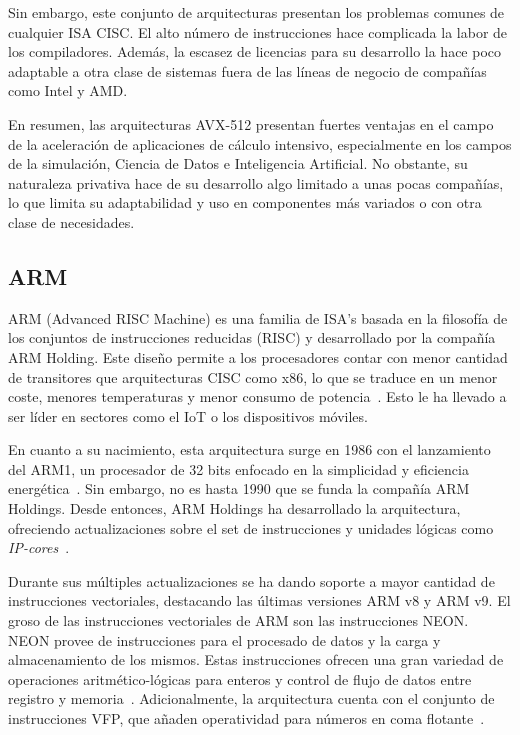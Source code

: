 Sin embargo, este conjunto de arquitecturas presentan los problemas comunes de
cualquier ISA CISC\@. El alto número de instrucciones hace complicada la
labor de los compiladores. Además, la escasez de licencias para su desarrollo
la hace poco adaptable a otra clase de sistemas fuera de las líneas de negocio
de compañías como Intel y AMD\@.

En resumen, las arquitecturas AVX-512 presentan fuertes ventajas en el campo de
la aceleración de aplicaciones de cálculo intensivo, especialmente en los
campos de la simulación, Ciencia de Datos e Inteligencia Artificial. No
obstante, su naturaleza privativa hace de su desarrollo algo limitado a unas
pocas compañías, lo que limita su adaptabilidad y uso en componentes más variados
o con otra clase de necesidades.

\subsection{ARM}

ARM (Advanced RISC Machine) es una familia de ISA's basada en la filosofía de
los conjuntos de instrucciones reducidas (RISC) y desarrollado por la compañía
ARM Holding. Este diseño permite a los procesadores contar con menor cantidad
de transitores que arquitecturas CISC como x86, lo que se traduce en un menor
coste, menores temperaturas y menor consumo de potencia~\cite{kaushikcase}.
Esto le ha llevado a ser líder en sectores como el IoT o los dispositivos
móviles.

En cuanto a su nacimiento, esta arquitectura surge en 1986 con el lanzamiento
del ARM1, un procesador de 32 bits enfocado en la simplicidad y eficiencia
energética~\cite{arm-history}. Sin embargo, no es hasta 1990 que se funda la
compañía ARM Holdings. Desde entonces, ARM Holdings ha desarrollado la
arquitectura, ofreciendo actualizaciones sobre el set de instrucciones y
unidades lógicas como \textit{IP-cores}~\cite{arm-history2}.

Durante sus múltiples actualizaciones se ha dando soporte a mayor cantidad
de instrucciones vectoriales, destacando las últimas versiones ARM v8 y ARM v9.
El groso de las instrucciones vectoriales de ARM son las instrucciones NEON\@.
NEON provee de instrucciones para el procesado de datos y la carga y
almacenamiento de los mismos. Estas instrucciones ofrecen una gran variedad de
operaciones aritmético-lógicas para enteros y control de flujo de datos entre
registro y memoria~\cite{arm-neon}\cite{arm-instructionsNEON}\@. Adicionalmente, la
arquitectura cuenta con el conjunto de instrucciones VFP, que añaden
operatividad para números en coma flotante~\cite{arm-vfp}.

